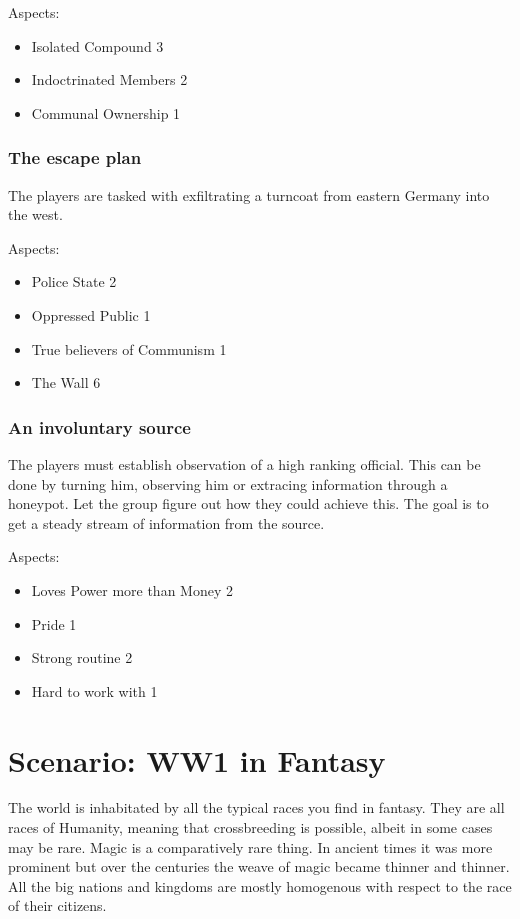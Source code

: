 \documentclass[11pt]{article}
\begin{document}
{Aspects:
\begin{itemize}
\item Isolated Compound 3
\item Indoctrinated Members 2
\item Communal Ownership 1
\end{itemize}


\subsubsection{The escape plan}
\label{sec:orge704adf}

The players are tasked with exfiltrating a turncoat from eastern Germany into the west.

Aspects:
\begin{itemize}
\item Police State 2
\item Oppressed Public 1
\item True believers of Communism 1
\item The Wall 6
\end{itemize}

\subsubsection{An involuntary source}
\label{sec:org9f7cb55}

The players must establish observation of a high ranking official. This can be done by turning him, observing him or extracing information through a honeypot. Let the group figure out how they could achieve this. The goal is to get a steady stream of information from the source.

Aspects:
\begin{itemize}
\item Loves Power more than Money 2
\item Pride 1
\item Strong routine 2
\item Hard to work with 1
\end{itemize}

\section{Scenario: WW1 in Fantasy}
\label{sec:org06a3d64}

The world is inhabitated by all the typical races you find in fantasy. They are all races of Humanity, meaning that crossbreeding is possible, albeit in some cases may be rare. Magic is a comparatively rare thing. In ancient times it was more prominent but over the centuries the weave of magic became thinner and thinner. All the big nations and kingdoms are mostly homogenous with respect to the race of their citizens. 

}
\end{document}
